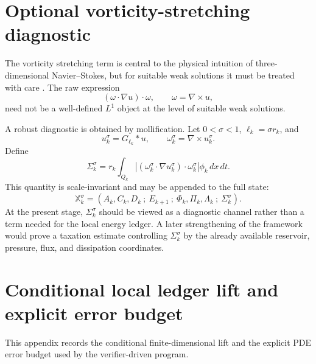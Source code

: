 \documentclass[11pt]{article}
\numberwithin{equation}{section}
\newcommand{\dd}{\,d}
\begin{document}
\appendix
\section{Optional vorticity-stretching diagnostic}\label{app:stretching-diagnostic}

The vorticity stretching term is central to the physical intuition of three-dimensional Navier--Stokes, but for suitable weak solutions it must be treated with care \cite{CKN1982,SereginLectureNotes}.  The raw expression
\[
(\omega\cdot\nabla u)\cdot\omega,
\qquad \omega=\nabla\times u,
\]
need not be a well-defined $L^1$ object at the level of suitable weak solutions.

A robust diagnostic is obtained by mollification.  Let $0<\sigma<1$, $\ell_k=\sigma r_k$, and
\[
u_k^\sigma=G_{\ell_k}*u,
\qquad
\omega_k^\sigma=\nabla\times u_k^\sigma.
\]
Define
\[
\Sigma_k^\sigma
=r_k\int_{Q_k}\left| (\omega_k^\sigma\cdot\nabla u_k^\sigma)\cdot\omega_k^\sigma\right|\phi_k\dd x\dd t.
\]
This quantity is scale-invariant and may be appended to the full state:
\[
\mathbb X_k^\sigma=(A_k,C_k,D_k\ ;\ E_{k+1}\ ;\ \Phi_k,\Pi_k,\Lambda_k\ ;\ \Sigma_k^\sigma).
\]
At the present stage, $\Sigma_k^\sigma$ should be viewed as a diagnostic channel rather than a term needed for the local energy ledger.  A later strengthening of the framework would prove a taxation estimate controlling $\Sigma_k^\sigma$ by the already available reservoir, pressure, flux, and dissipation coordinates.


\section{Conditional local ledger lift and explicit error budget}\label{app:local-ledger-lift}
\noindent This appendix records the conditional finite-dimensional lift and the explicit PDE error budget used by the verifier-driven program.\label{subsec:conditional-local-ledger-lift}
\end{document}
